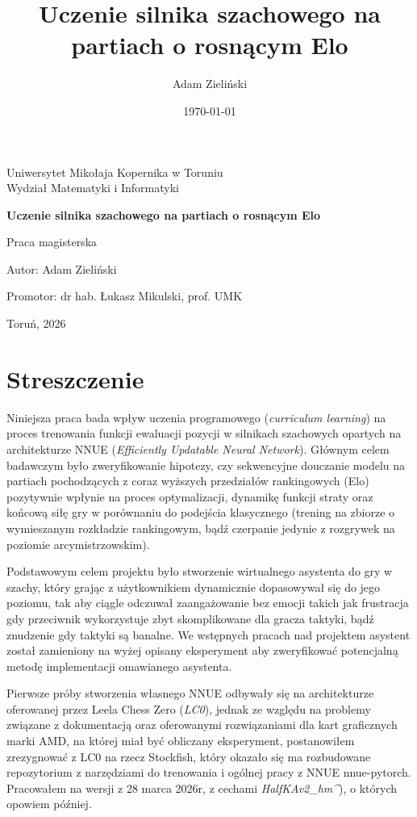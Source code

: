 \documentclass[12pt,a4paper]{report}
\title{Uczenie silnika szachowego na partiach o rosnącym Elo}
\author{Adam Zieliński}
\date{\today}
\begin{document}
\begin{titlepage}
    \centering
    \vspace*{1cm}
    {\Large Uniwersytet Mikołaja Kopernika w Toruniu\\ Wydział Matematyki i Informatyki \par}
    \vspace{3cm}
    {\Huge \textbf{Uczenie silnika szachowego na partiach o rosnącym Elo} \par}
    \vspace{2cm}
    {\Large Praca magisterska \par}
    \vspace{2cm}
    {\Large Autor: Adam Zieliński \par}
    {\Large Promotor: dr hab. Łukasz Mikulski, prof. UMK \par}
    \vfill
    {\Large Toruń, 2026 \par}
\end{titlepage}

\tableofcontents

\chapter*{Streszczenie}

Niniejsza praca bada wpływ uczenia programowego (\textit{curriculum learning}) na proces trenowania funkcji ewaluacji pozycji w silnikach szachowych opartych na architekturze NNUE (\textit{Efficiently Updatable Neural Network}). Głównym celem badawczym było zweryfikowanie hipotezy, czy sekwencyjne douczanie modelu na partiach pochodzących z coraz wyższych przedziałów rankingowych (Elo) pozytywnie wpłynie na proces optymalizacji, dynamikę funkcji straty oraz końcową siłę gry w porównaniu do podejścia klasycznego (trening na zbiorze o wymieszanym rozkładzie rankingowym, bądź czerpanie jedynie z rozgrywek na poziomie arcymistrzowskim).

Podstawowym celem projektu było stworzenie wirtualnego asystenta do gry w szachy, który grając z użytkownikiem dynamicznie dopasowywał się do jego poziomu, tak aby ciągle odczuwał zaangażowanie bez emocji takich jak frustracja gdy przeciwnik wykorzystuje zbyt skomplikowane dla gracza taktyki, bądź znudzenie gdy taktyki są banalne. We wstępnych pracach nad projektem asystent został zamieniony na wyżej opisany eksperyment aby zweryfikować potencjalną metodę implementacji omawianego asystenta. 

Pierwsze próby stworzenia własnego NNUE odbywały się na architekturze oferowanej przez Leela Chess Zero (\textit{LC0}), jednak ze względu na problemy związane z dokumentacją oraz oferowanymi rozwiązaniami dla kart graficznych marki AMD, na której miał być obliczany eksperyment, postanowiłem zrezygnować z LC0 na rzecz Stockfish, który okazało się ma rozbudowane repozytorium z narzędziami do trenowania i ogólnej pracy z NNUE nnue-pytorch. Pracowałem na wersji z 28 marca 2026r, z cechami \textit{HalfKAv2\_hm\string^}), o których opowiem później.
\end{document}
